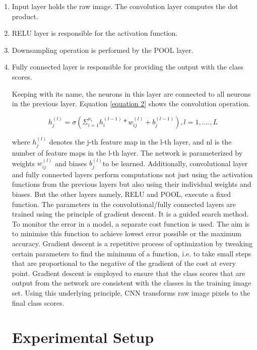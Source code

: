 \documentclass[conference]{IEEEtran}
\begin{document}
\begin{enumerate}

\item Input layer holds the raw image. The convolution layer computes the dot product.
\item RELU layer is responsible for the activation function.
\item Downsampling operation is performed by the POOL layer.
\item  Fully connected layer is responsible for providing the output with the class scores.

    Keeping with its name, the neurons in this layer are connected to all neurons in the previous layer. Equation \ref{equation 2} shows the convolution operation.


 

\begin{equation}
\label{equation 2}
h_j^{(l)} = \sigma(\Sigma_{i=1}^{n_i} h_i^{(l-1)} * w_{ij}^{(l)} + b_j^{(l-1)}) , l=1,....,L
\end{equation}

where $h^{(l)}_j$ denotes the j-th feature map in the l-th layer, and nl is the number of feature maps in the l-th layer. The network is parameterized by weights $w_{ij}^{(l)}$ and biases $b_j^{(l)}$to be learned\cite{lee2009convolutional}.  Additionally, convolutional layer and fully connected layers perform computations not just using the activation functions from the previous layers but also using their individual weights and biases. But the other layers namely, RELU and POOL, execute a  fixed function. The parameters in the convolutional/fully connected layers are trained using the principle of gradient descent. It is a guided search method. To monitor the error in a model, a separate cost function is used. The aim is to minimise this function to achieve lowest error possible or the maximum accuracy. Gradient descent is a repetitive process of optimization by tweaking certain parameters to find the minimum of a function, i.e. to take small steps that are proportional to the negative of the gradient of the cost at every point. Gradient descent is employed to ensure that the class scores that are output from the network are consistent with the classes in the training image set. Using this underlying principle, CNN transforms raw image pixels to the final class scores. 



\section{Experimental Setup}
\label{sec:4 Experimental Setup} 



\end{enumerate}
\end{document}
